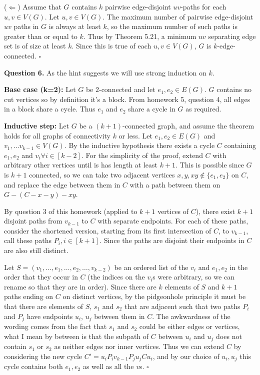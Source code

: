 \documentclass[letterpaper, reqno,11pt]{article}
\begin{document}
($\Leftarrow$) Assume that $G$ contains $k$ pairwise edge-disjoint $uv$-paths for each $u,v\in V(G)$. Let $u,v\in V(G)$. The maximum number of pairwise edge-disjoint $uv$ paths in $G$ is always at least $k$, so the maximum number of such paths is greater than or equal to $k$. Thus by Theorem 5.21, a minimum $uv$ separating edge set is of size at least $k$. Since this is true of each $u,v\in V(G)$, $G$ is $k$-edge-connected. $\square$

{\medskip\noindent\bf Question 6.} As the hint suggests we will use strong induction on $k$. 

{\noindent\bf Base case (k=2):} Let $G$ be $2$-connected and let $e_1,e_2\in E(G)$. $G$ contains no cut vertices so by definition it's a block. From homework 5, question 4, all edges in a block share a cycle. Thus $e_1$ and $e_2$ share a cycle in $G$ as required. 

{\noindent\bf Inductive step:} Let $G$ be a $(k+1)$-connected graph, and assume the theorem holds for all graphs of connectivity $k$ or less. Let $e_1,e_2\in E(G)$ and $v_1,\ldots v_{k-1}\in V(G)$. By the inductive hypothesis there exists a cycle $C$ containing $e_1,e_2$ and $v_i\forall i\in [k-2]$. For the simplicity of the proof, extend $C$ with arbitrary other vertices until is has length at least $k+1$. This is possible since $G$ is $k+1$ connected, so we can take two adjacent vertices $x,y, xy\notin \{e_1,e_2\} $ on $C$, and replace the edge between them in $C$ with a path between them on $G-(C-x-y)-xy$. 

By question 3 of this homework (applied to $k+1$ vertices of $C$), there exist $k+1$ disjoint paths from $v_{k-1}$ to $C$ with separate endpoints. For each of these paths, consider the shortened version, starting from its first intersection of $C$, to $v_{k-1}$, call these paths $P_i,i\in [k+1]$. Since the paths are disjoint their endpoints in $C$ are also still distinct. 

Let $S=(v_1,\ldots, e_1, \ldots, e_2,\ldots, v_{k-2})$ be an ordered list of the $v_i$ and $e_1,e_2$ in the order that they occur in $C$ (the indices on the $v_i$s were arbitrary, so we can rename so that they are in order). Since there are $k$ elements of $S$ and $k+1$ paths ending on $C$ on distinct vertices, by the pidgeonhole principle it must be that there are elements of $S$, $s_1$ and $s_2$ that are adjacent such that two paths $P_i$ and $P_j$ have endpoints $u_i$, $u_j$ between them in $C$. The awkwardness of the wording comes from the fact that $s_1$ and $s_2$ could be either edges or vertices, what I mean by between is that the subpath of $C$ between $u_i$ and $u_j$ does not contain $s_1$ or $s_2$ as neither edges nor inner vertices. Thus we can extend $C$ by considering the new cycle $C'=u_iP_iv_{k-1}P_ju_jCu_i$, and by our choice of $u_i,u_j$ this cycle contains both $e_1,e_2$ as well as all the $v$s. $\square$
\end{document}
